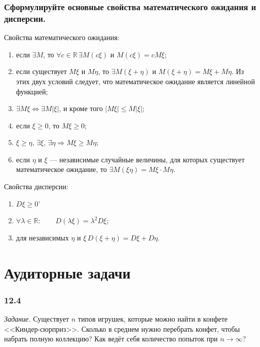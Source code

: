 \subsubsection*{Сформулируйте основные свойства математического ожидания и дисперсии.}

Свойства математического ожидания:
\begin{enumerate}
\item если $ \exists M$, то $ \forall c \in \mathbb{R} \, \exists M \left( c \xi \right) $ и $ M \left( c \xi \right) = cM \xi $;
\item если существует $M \xi $ и $M \eta $, то $ \exists M \left( \xi + \eta \right) $ и $M \left( \xi + \eta \right) = M \xi + M \eta $.
Из этих двух условий следует, что математическое ожидание является линейной функцией;
\item $ \exists M \xi \iff \exists M \left| \xi \right| $, и кроме того $ \left| M \xi \right| \leq M \left| \xi \right| $;
\item если $ \xi \geq 0$, то $M \xi \geq 0$;
\item $\xi \geq \eta, \, \exists \xi, \, \exists \eta \Rightarrow M \xi \geq M \eta $;
\item если $ \eta $ и $ \xi $ --- независимые случайные величины,
для которых существует математическое ожидание, то $ \exists M \left( \xi \eta \right) = M \xi \cdot M \eta $.
\end{enumerate}

Свойства дисперсии:
\begin{enumerate}
\item $D \xi \geq 0$'
\item $ \forall \lambda \in \mathbb{R}: \qquad D \left( \lambda \xi \right) = \lambda^2 D \xi $;
\item для независимых $ \eta $ и $ \xi \, D \left( \xi + \eta \right) = D \xi + D \eta $.
\end{enumerate}

\section*{Аудиторные задачи}

\subsubsection*{12.4}

\textit{Задание.} Существует $n$ типов игрушек, которые можно найти в конфете <<Киндер-сюрприз>>.
Сколько в среднем нужно перебрать конфет, чтобы набрать полную коллекцию?
Как ведёт себя количество попыток при $n \to \infty $?

